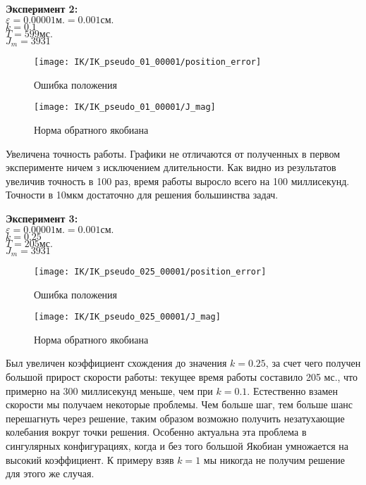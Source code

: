 	 	\clearpage
		\textbf{Эксперимент 2:}\\
		$\varepsilon = 0.00001\text{м.} = 0.001\text{см.}$\\
		$k = 0.1$\\
		$T = 599 \text{мс.}$\\
		$J_{m} = 3931$
		
		\begin{figure}[h!]
			\centering
			\texttt{[image: IK/IK\_pseudo\_01\_00001/position\_error]}
			\caption{Ошибка положения}
			\label{fig:3_4_3}
		\end{figure}
		\begin{figure}[h!]
			\centering
			\texttt{[image: IK/IK\_pseudo\_01\_00001/J\_mag]}
			\caption{Норма обратного якобиана}
			\label{fig:3_4_4}
		\end{figure}
		Увеличена точность работы. Графики не отличаются от полученных в первом эксперименте ничем з исключением длительности. Как видно из результатов увеличив точность в 100 раз, время работы выросло всего на 100 миллисекунд. Точности в 10мкм достаточно для решения большинства задач.
		
		\clearpage
		\textbf{Эксперимент 3:}\\
		$\varepsilon = 0.00001\text{м.} = 0.001\text{см.}$\\
		$k = 0.25$\\
		$T = 205 \text{мс.}$\\
		$J_{m} = 3931$
		
		\begin{figure}[h!]
			\centering
			\texttt{[image: IK/IK\_pseudo\_025\_00001/position\_error]}
			\caption{Ошибка положения}
			\label{fig:3_4_5}
		\end{figure}
		\begin{figure}[h!]
			\centering
			\texttt{[image: IK/IK\_pseudo\_025\_00001/J\_mag]}
			\caption{Норма обратного якобиана}
			\label{fig:3_4_6}
		\end{figure}
		Был увеличен коэффициент схождения до значения $k=0.25$, за счет чего получен большой прирост скорости работы: текущее время работы составило 205 мс., что примерно на 300 миллисекунд меньше, чем при $k=0.1$. Естественно взамен скорости мы получаем некоторые проблемы. Чем больше шаг, тем больше шанс перешагнуть через решение, таким образом возможно получить незатухающие колебания вокруг точки решения. Особенно актуальна эта проблема в сингулярных конфигурациях, когда и без того большой Якобиан умножается на высокий коэффициент. К примеру взяв $k=1$ мы никогда не получим решение для этого же случая.
		
